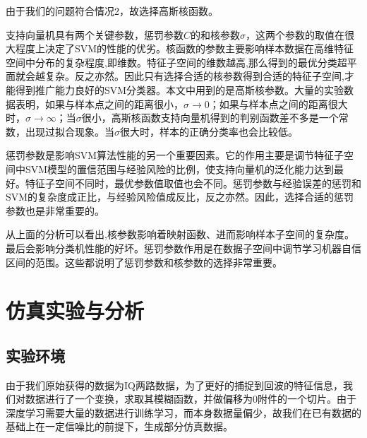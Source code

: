 由于我们的问题符合情况2，故选择高斯核函数。

支持向量机具有两个关键参数，惩罚参数$C$的和核参数$\sigma$，这两个参数的取值在很大程度上决定了SVM的性能的优劣。核函数的参数主要影响样本数据在高维特征空间中分布的复杂程度,即维数。特征子空间的维数越高,那么得到的最优分类超平面就会越复杂。反之亦然。因此只有选择合适的核参数得到合适的特征子空间,才能得到推广能力良好的SVM分类器。本文中用到的是高斯核参数。大量的实验数据表明，如果与样本点之间的距离很小，$\sigma\rightarrow0$；如果与样本点之间的距离很大时，$\sigma\rightarrow\infty$；当$\sigma$很小，高斯核函数支持向量机得到的判别函数差不多是一个常数，出现过拟合现象。当$\sigma$很大时，样本的正确分类率也会比较低。

惩罚参数是影响SVM算法性能的另一个重要因素。它的作用主要是调节特征子空间中SVM模型的置信范围与经验风险的比例，使支持向量机的泛化能力达到最好。特征子空间不同时，最优参数值取值也会不同。惩罚参数与经验误差的惩罚和SVM的复杂度成正比，与经验风险值成反比，反之亦然。因此，选择合适的惩罚参数也是非常重要的。

从上面的分析可以看出,核参数影响着映射函数、进而影响样本子空间的复杂度。最后会影响分类机性能的好坏。惩罚参数作用是在数据子空间中调节学习机器自信区间的范围。这些都说明了惩罚参数和核参数的选择非常重要。


\section{仿真实验与分析}


\subsection{实验环境}

由于我们原始获得的数据为IQ两路数据，为了更好的捕捉到回波的特征信息，我们对数据进行了一个变换，求取其模糊函数，并做偏移为0附件的一个切片。由于深度学习需要大量的数据进行训练学习，而本身数据量偏少，故我们在已有数据的基础上在一定信噪比的前提下，生成部分仿真数据。

